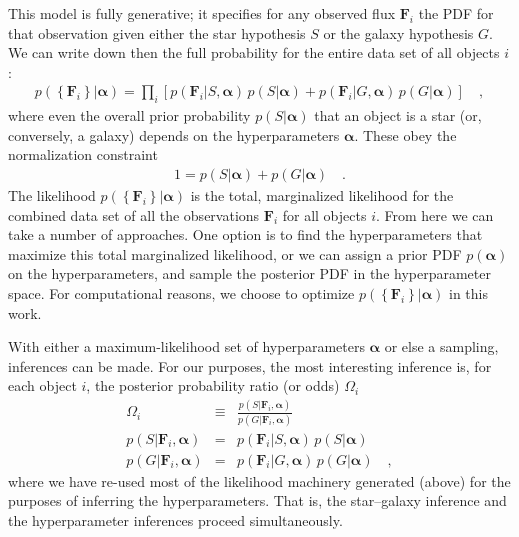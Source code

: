 \documentclass[12pt,preprint]{aastex}
\newcommand{\datavector}[1]{\boldsymbol{#1}}
\newcommand{\flux}{\datavector{F}}
\newcommand{\hyperpars}{\datavector{\alpha}}
\newcommand{\setofall}[1]{\left\{{#1}\right\}}
\newcommand{\allflux}{\setofall{\flux_i}}
\begin{document}
This model is fully generative; it specifies for any observed flux
$\flux_i$ the PDF for that observation given either the star
hypothesis $S$ or the galaxy hypothesis $G$.  We can write down then
the full probability for the entire data set of all objects $i$:
\begin{eqnarray}\displaystyle
\label{eqn:fullprob}
p(\allflux|\hyperpars) = \prod_i \left[p(\flux_i|S,\hyperpars)\,p(S|\hyperpars)
                                     + p(\flux_i|G,\hyperpars)\,p(G|\hyperpars)
                                \right]
\quad ,
\end{eqnarray}
where even the overall prior probability $p(S|\hyperpars)$ that an
object is a star (or, conversely, a galaxy) depends on the
hyperparameters $\hyperpars$.  These obey the normalization constraint
\begin{eqnarray}\displaystyle
1 = p(S|\hyperpars) + p(G|\hyperpars)
\quad .
\end{eqnarray}
The likelihood $p(\allflux|\hyperpars)$ is the total, marginalized
likelihood for the combined data set of all the observations $\flux_i$
for all objects $i$.  From here we can take a number of approaches. 
One option is to find the hyperparameters that maximize this total 
marginalized likelihood, or we can assign a prior PDF $p(\hyperpars)$ 
on the hyperparameters, and sample the posterior PDF in the 
hyperparameter space.  For computational reasons, we choose to 
optimize $p(\allflux|\hyperpars)$ in this work.

With either a maximum-likelihood set of hyperparameters $\hyperpars$
or else a sampling, inferences can be made.  For our purposes, the
most interesting inference is, for each object $i$, the posterior
probability ratio (or odds) $\Omega_i$
\begin{eqnarray}\displaystyle
\Omega_i & \equiv & \frac{p(S|\flux_i,\hyperpars)}
                         {p(G|\flux_i,\hyperpars)}
\nonumber\\
p(S|\flux_i,\hyperpars) & = & p(\flux_i|S,\hyperpars)\,p(S|\hyperpars)
\nonumber\\
p(G|\flux_i,\hyperpars) & = & p(\flux_i|G,\hyperpars)\,p(G|\hyperpars)
\quad ,
\end{eqnarray}
where we have re-used most of the likelihood machinery generated
(above) for the purposes of inferring the hyperparameters.  That is,
the star--galaxy inference and the hyperparameter inferences proceed
simultaneously.
\end{document}
